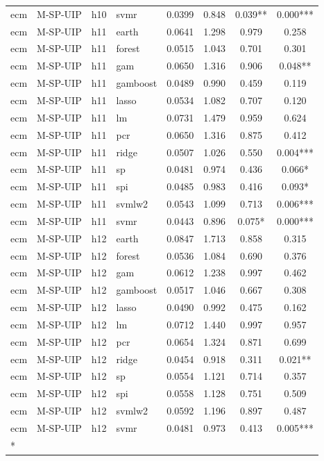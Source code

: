 \begin{ThreePartTable}
\begin{longtable}[t]{llclcccc}
ecm & M-SP-UIP & h10 & svmr & 0.0399 & 0.848 & 0.039** & 0.000***\\
\addlinespace
ecm & M-SP-UIP & h11 & earth & 0.0641 & 1.298 & 0.979 & 0.258\\
ecm & M-SP-UIP & h11 & forest & 0.0515 & 1.043 & 0.701 & 0.301\\
ecm & M-SP-UIP & h11 & gam & 0.0650 & 1.316 & 0.906 & 0.048**\\
ecm & M-SP-UIP & h11 & gamboost & 0.0489 & 0.990 & 0.459 & 0.119\\
ecm & M-SP-UIP & h11 & lasso & 0.0534 & 1.082 & 0.707 & 0.120\\
ecm & M-SP-UIP & h11 & lm & 0.0731 & 1.479 & 0.959 & 0.624\\
ecm & M-SP-UIP & h11 & pcr & 0.0650 & 1.316 & 0.875 & 0.412\\
ecm & M-SP-UIP & h11 & ridge & 0.0507 & 1.026 & 0.550 & 0.004***\\
ecm & M-SP-UIP & h11 & sp & 0.0481 & 0.974 & 0.436 & 0.066*\\
ecm & M-SP-UIP & h11 & spi & 0.0485 & 0.983 & 0.416 & 0.093*\\
ecm & M-SP-UIP & h11 & svmlw2 & 0.0543 & 1.099 & 0.713 & 0.006***\\
ecm & M-SP-UIP & h11 & svmr & 0.0443 & 0.896 & 0.075* & 0.000***\\
\addlinespace
ecm & M-SP-UIP & h12 & earth & 0.0847 & 1.713 & 0.858 & 0.315\\
ecm & M-SP-UIP & h12 & forest & 0.0536 & 1.084 & 0.690 & 0.376\\
ecm & M-SP-UIP & h12 & gam & 0.0612 & 1.238 & 0.997 & 0.462\\
ecm & M-SP-UIP & h12 & gamboost & 0.0517 & 1.046 & 0.667 & 0.308\\
ecm & M-SP-UIP & h12 & lasso & 0.0490 & 0.992 & 0.475 & 0.162\\
ecm & M-SP-UIP & h12 & lm & 0.0712 & 1.440 & 0.997 & 0.957\\
ecm & M-SP-UIP & h12 & pcr & 0.0654 & 1.324 & 0.871 & 0.699\\
ecm & M-SP-UIP & h12 & ridge & 0.0454 & 0.918 & 0.311 & 0.021**\\
ecm & M-SP-UIP & h12 & sp & 0.0554 & 1.121 & 0.714 & 0.357\\
ecm & M-SP-UIP & h12 & spi & 0.0558 & 1.128 & 0.751 & 0.509\\
ecm & M-SP-UIP & h12 & svmlw2 & 0.0592 & 1.196 & 0.897 & 0.487\\
ecm & M-SP-UIP & h12 & svmr & 0.0481 & 0.973 & 0.413 & 0.005***\\*
\end{longtable}
\end{ThreePartTable}
\endgroup{}
